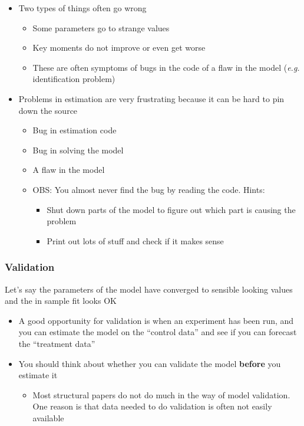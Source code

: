 \documentclass[11pt]{article}
\begin{document}
\begin{itemize}
\begin{itemize}
\item Two types of things often go wrong
\begin{itemize}
\item Some parameters go to strange values
\item Key moments do not improve or even get worse
\item These are often symptoms of bugs in the code of a flaw in the model (\emph{e.g.} identification problem)
\end{itemize}
\item Problems in estimation are very frustrating because it can be hard to pin down the source
\begin{itemize}
\item Bug in estimation code
\item Bug in solving the model
\item A flaw in the model
\item OBS: You almost never find the bug by reading the code. Hints:
\begin{itemize}
\item Shut down parts of the model to figure out which part is causing the problem
\item Print out lots of stuff and check if it makes sense
\end{itemize}
\end{itemize}
\end{itemize}
\end{itemize}


\subsubsection{Validation}
\label{sec:orgcd3e264}

Let's say the parameters of the model have converged to sensible looking values and the in sample fit looks OK

\begin{itemize}
\item A good opportunity for validation is when an experiment has been run, and you can estimate the model on the ``control data'' and see if you can forecast the ``treatment data''
\item You should think about whether you can validate the model \textbf{before} you estimate it
\begin{itemize}
\item Most structural papers do not do much in the way of model validation. One reason is that data needed to do validation is often not easily available
\end{itemize}
\end{itemize}
\end{document}
